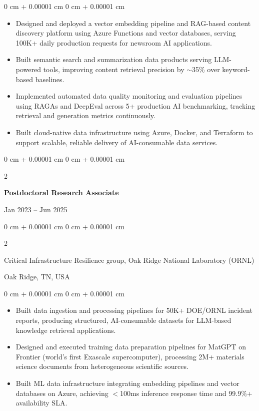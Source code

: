 \documentclass[10pt, letterpaper]{article}
\newenvironment{highlights}{
    \begin{itemize}[
        topsep=0.10 cm,
        parsep=0.10 cm,
        partopsep=0pt,
        itemsep=0pt,
        leftmargin=0 cm + 10pt
    ]
}{
    \end{itemize}
} %
\newenvironment{onecolentry}{
    \begin{adjustwidth}{
        0 cm + 0.00001 cm
    }{
        0 cm + 0.00001 cm
    }
}{
    \end{adjustwidth}
} %
\newenvironment{twocolentry}[2][]{
    \onecolentry
    \def\secondColumn{#2}
    \setcolumnwidth{\fill, 4.5 cm}
    \begin{paracol}{2}
}{
    \switchcolumn \raggedleft \secondColumn
    \end{paracol}
    \endonecolentry
} %
\begin{document}
    \begin{onecolentry}
        \begin{highlights}
            \item Designed and deployed a vector embedding pipeline and RAG-based content discovery platform using Azure Functions and vector databases, serving 100K+ daily production requests for newsroom AI applications.
            \item Built semantic search and summarization data products serving LLM-powered tools, improving content retrieval precision by $\sim$35\% over keyword-based baselines.
            \item Implemented automated data quality monitoring and evaluation pipelines using RAGAs and DeepEval across 5+ production AI benchmarking, tracking retrieval and generation metrics continuously.
            \item Built cloud-native data infrastructure using Azure, Docker, and Terraform to support scalable, reliable delivery of AI-consumable data services.
        \end{highlights}
    \end{onecolentry}

\vspace{1mm}

    \begin{twocolentry}{Jan 2023 -- Jun 2025}
        \textbf{Postdoctoral Research Associate}
    \end{twocolentry}
    \begin{twocolentry}{Oak Ridge, TN, USA}
        Critical Infrastructure Resilience group, Oak Ridge National Laboratory (ORNL)
    \end{twocolentry}
    \vspace{0.10 cm}
    \begin{onecolentry}
        \begin{highlights}
            \item Built data ingestion and processing pipelines for 50K+ DOE/ORNL incident reports, producing structured, AI-consumable datasets for LLM-based knowledge retrieval applications.
            \item Designed and executed training data preparation pipelines for MatGPT on Frontier (world's first Exascale supercomputer), processing 2M+ materials science documents from heterogeneous scientific sources.
            \item Built ML data infrastructure integrating embedding pipelines and vector databases on Azure, achieving $<$100ms inference response time and 99.9\%+ availability SLA.
        \end{highlights}
    \end{onecolentry}
\end{document}
